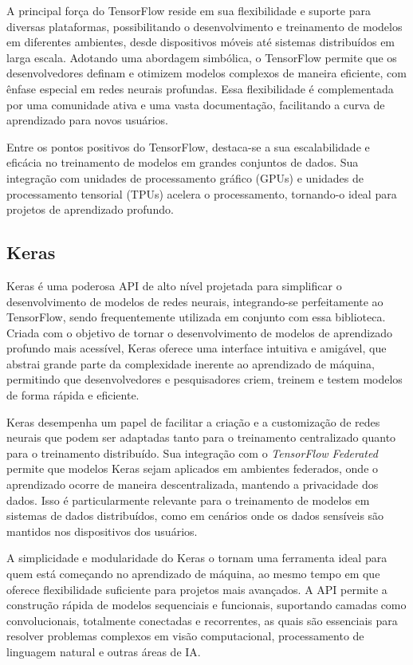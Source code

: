A principal força do TensorFlow reside em sua flexibilidade e suporte para diversas plataformas, possibilitando o desenvolvimento e treinamento de modelos em diferentes ambientes, desde dispositivos móveis até sistemas distribuídos em larga escala. Adotando uma abordagem simbólica, o TensorFlow permite que os desenvolvedores definam e otimizem modelos complexos de maneira eficiente, com ênfase especial em redes neurais profundas. Essa flexibilidade é complementada por uma comunidade ativa e uma vasta documentação, facilitando a curva de aprendizado para novos usuários.

Entre os pontos positivos do TensorFlow, destaca-se a sua escalabilidade e eficácia no treinamento de modelos em grandes conjuntos de dados. Sua integração com unidades de processamento gráfico (GPUs) e unidades de processamento tensorial (TPUs) acelera o processamento, tornando-o ideal para projetos de aprendizado profundo.

\subsection{Keras}

Keras é uma poderosa API de alto nível projetada para simplificar o desenvolvimento de modelos de redes neurais, integrando-se perfeitamente ao TensorFlow, sendo frequentemente utilizada em conjunto com essa biblioteca. Criada com o objetivo de tornar o desenvolvimento de modelos de aprendizado profundo mais acessível, Keras oferece uma interface intuitiva e amigável, que abstrai grande parte da complexidade inerente ao aprendizado de máquina, permitindo que desenvolvedores e pesquisadores criem, treinem e testem modelos de forma rápida e eficiente.

Keras desempenha um papel de facilitar a criação e a customização de redes neurais que podem ser adaptadas tanto para o treinamento centralizado quanto para o treinamento distribuído. Sua integração com o \textit{TensorFlow Federated} permite que modelos Keras sejam aplicados em ambientes federados, onde o aprendizado ocorre de maneira descentralizada, mantendo a privacidade dos dados. Isso é particularmente relevante para o treinamento de modelos em sistemas de dados distribuídos, como em cenários onde os dados sensíveis são mantidos nos dispositivos dos usuários.

A simplicidade e modularidade do Keras o tornam uma ferramenta ideal para quem está começando no aprendizado de máquina, ao mesmo tempo em que oferece flexibilidade suficiente para projetos mais avançados. A API permite a construção rápida de modelos sequenciais e funcionais, suportando camadas como convolucionais, totalmente conectadas e recorrentes, as quais são essenciais para resolver problemas complexos em visão computacional, processamento de linguagem natural e outras áreas de IA.

